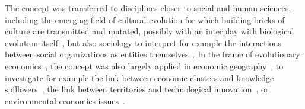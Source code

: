 \documentclass[11pt]{article}
\begin{document}
The concept was transferred to disciplines closer to social and human sciences, including the emerging field of cultural evolution \cite{Mesoudi25072017} for which building bricks of culture are transmitted and mutated, possibly with an interplay with biological evolution itself~\citep{bull2000meme}, but also sociology to interpret for example the interactions between social organizations as entities themselves~\citep{volberda2003co}. In the frame of evolutionary economics~\citep{nelson2009evolutionary}, the concept was also largely applied in economic geography~\citep{schamp201020}, to investigate for example the link between economic clusters and knowledge spillovers~\citep{doi:10.1080/00343400802662658}, the link between territories and technological innovation~\citep{colletis2010co}, or environmental economics issues~\citep{kallis2007coevolution}.
\end{document}
